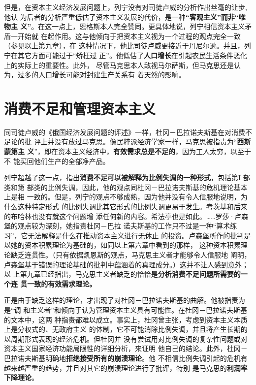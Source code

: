 但是，在资本主义经济发展问题上，列宁没有对司徒卢威的分析作出丝毫的让步,他认
为后者的分析严重低估了资本主义发展的代价，是一种\textbf{“客观主义”而非“唯物主
义”}。在这一点上，恩格斯本人完全赞同。更具体地说，列宁相信资本主义矛盾一开始就
在起作用。这与他倾向于把资本主义视为一个过程的观点完全一致（参见以上第九章），在
这种情况下，他比司徒卢威更接近于丹尼尔逊。并且，列宁在其它方面可能过于“矫枉过
正”。他低估了\textbf{人口增长}在引起农民生活条件恶化上的实际上的重要性。此外，
尽管马克思本人敌视马尔萨斯，但马克思还是认为，过多的人口增长可能对封建生产关系有
着天然的影响。

\section{消费不足和管理资本主义}

同司徒卢威的《俄国经济发展问题的评述》一样，杜冈－巴拉诺夫斯基在对消费不足论的批
评上并没有放过马克思。像民粹派经济学家一样，马克思被指责为“\textbf{西斯蒙第主
  义}”，即在资本主义经济中，\textbf{有效需求总是不足的}，因为工人太穷，以至于不
能买回他们生产的全部净产品。

列宁超越了这一点，指出\textbf{消费不足可以被解释为比例失调的一种形式}，包括第Ι
部类和第 部类的比例失调，因此，他的观点同杜冈－巴拉诺夫斯基的危机理论基本上是相
一致的。但是，列宁的观点不够成熟，因为他并没有令人信服地说明，为什么这种特定形式
的比例失调比其它形式的比例失调更易于发生。考茨基和后来的布哈林也没有就这个问题增
添任何新的内容。希法亭也是如此。……罗莎·卢森堡的观点较为深刻，她指责杜冈－巴拉
诺夫斯基的工作只不过是一种“算术练习”，它无法解释是什么在推动资本主义进行无休止
的投资。卢森堡所作的批判是以她的资本积累理论为基础的，如同以上第六章中看到的那样，
这种资本积累理论缺乏连贯性。（只有依据凯恩斯的观点，马克思主义者才能够令人信服地
阐明，卢森堡基于错误的理论基础的批判中蕴涵着的真理成分。）这并不让人感到意外；以
上第九章已经指出，马克思主义者缺乏的恰恰是\textbf{分析消费不足问题所需要的一个连
贯一致的有效需求理论。}

正是由于缺乏这样的理论，才出现了对杜冈－巴拉诺夫斯基的曲解。他被指责为是“调
和主义者”和倾向于认为管理资本主义具有可能性。在杜冈－巴拉诺夫斯基的文本中，这两
种指责都难以成立。事实上，杜冈曾主张，考虑到资本主义本质上是分权式的、无政府主义
的体制，它不可能消除比例失调，并且将产生长期的以周期形式表现的经济危机。但杜冈并
没有尝试用对比例失调的复杂性问题或对资本主义国家经济功能局限性的详细分析，来证明
他自己的结论。此外，杜冈－巴拉诺夫斯基明确地\textbf{拒绝接受所有的崩溃理论}。他
不相信比例失调引起的危机有越来越严重的趋势，并且对其它的崩溃理论进行了批评，特别
是马克思的\textbf{利润率下降理论}。

